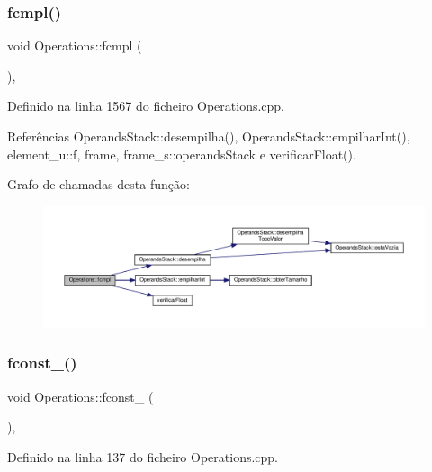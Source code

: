 \subsubsection{\texorpdfstring{fcmpl()}{fcmpl()}}
{\footnotesize\ttfamily void Operations\+::fcmpl (\begin{DoxyParamCaption}{ }\end{DoxyParamCaption})\hspace{0.3cm}{\ttfamily [static]}, {\ttfamily [private]}}



Definido na linha 1567 do ficheiro Operations.\+cpp.



Referências Operands\+Stack\+::desempilha(), Operands\+Stack\+::empilhar\+Int(), element\+\_\+u\+::f, frame, frame\+\_\+s\+::operands\+Stack e verificar\+Float().

Grafo de chamadas desta função\+:\nopagebreak
\begin{figure}[H]
\begin{center}
\leavevmode
\includegraphics[width=350pt]{classOperations_aa4a8e2be93a5cc69e40f483958014e39_cgraph}
\end{center}
\end{figure}
\mbox{\label{classOperations_ad3d2d82d63e7a96e144cdf014d6fb1d9}} 
\subsubsection{\texorpdfstring{fconst\+\_()}{fconst\_0()}}
{\footnotesize\ttfamily void Operations\+::fconst\+\_ (\begin{DoxyParamCaption}{ }\end{DoxyParamCaption})\hspace{0.3cm}{\ttfamily [static]}, {\ttfamily [private]}}



Definido na linha 137 do ficheiro Operations.\+cpp.



